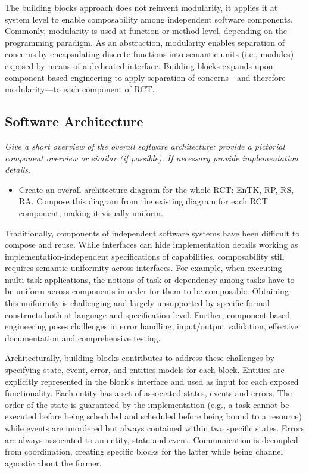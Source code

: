 \documentclass[preprint,12pt, a4paper]{elsarticle}
\begin{document}
The building blocks approach does not reinvent modularity, it applies it at
system level to enable composability among independent software components.
Commonly, modularity is used at function or method level, depending on the
programming paradigm. As an abstraction, modularity enables separation of
concerns by encapsulating discrete functions into semantic units (i.e.,
modules) exposed by means of a dedicated interface. Building blocks expands
upon component-based engineering to apply separation of concerns---and
therefore modularity---to each component of RCT\@.


\subsection{Software Architecture}\label{sec:architecture}

{\em Give a short overview of the overall software architecture; provide a
pictorial component overview or similar (if possible). If necessary provide
implementation details.}

\begin{itemize}
  \item Create an overall architecture diagram for the whole RCT\@: EnTK, RP,
  RS, RA\@. Compose this diagram from the existing diagram for each RCT
  component, making it visually uniform.
\end{itemize}

Traditionally, components of independent software systems have been difficult
to compose and reuse. While interfaces can hide implementation details
working as implementation-independent specifications of capabilities,
composability still requires semantic uniformity across interfaces. For
example, when executing multi-task applications, the notions of task or
dependency among tasks have to be uniform across components in order for them
to be composable. Obtaining this uniformity is challenging and largely
unsupported by specific formal constructs both at language and specification
level. Further, component-based engineering poses challenges in error
handling, input/output validation, effective documentation and comprehensive
testing.

Architecturally, building blocks contributes to address these challenges by
specifying state, event, error, and entities models for each block. Entities
are explicitly represented in the block's interface and used as input for
each exposed functionality. Each entity has a set of associated states,
events and errors. The order of the state is guaranteed by the implementation
(e.g., a task cannot be executed before being scheduled and scheduled before
being bound to a resource) while events are unordered but always contained
within two specific states. Errors are always associated to an entity, state
and event. Communication is decoupled from coordination, creating specific
blocks for the latter while being channel agnostic about the former.
\end{document}
